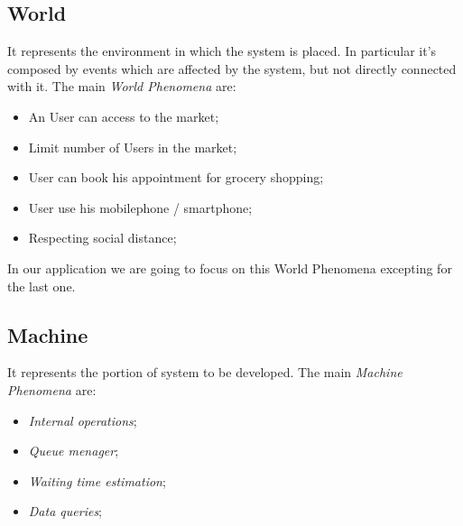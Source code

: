 \subsection{World}

It represents the environment in which the system is placed. In particular it's composed by events which are affected by the system, but not directly connected with it.
The main \textit{World Phenomena} are:

\begin{itemize}
\item An User can access to the market;
\item Limit number of Users in the market;
\item User can book his appointment for grocery shopping;
\item User use his mobilephone / smartphone;
\item Respecting social distance;
\end{itemize}

In our application we are going to focus on this World Phenomena excepting for the last one.

\subsection{Machine}
It represents the portion of system to be developed.
The main \textit{Machine Phenomena} are:
\begin{itemize}
\item \textit{Internal operations};
\item \textit{Queue menager};
\item \textit{Waiting time estimation};
\item \textit{Data queries};
\end{itemize}
